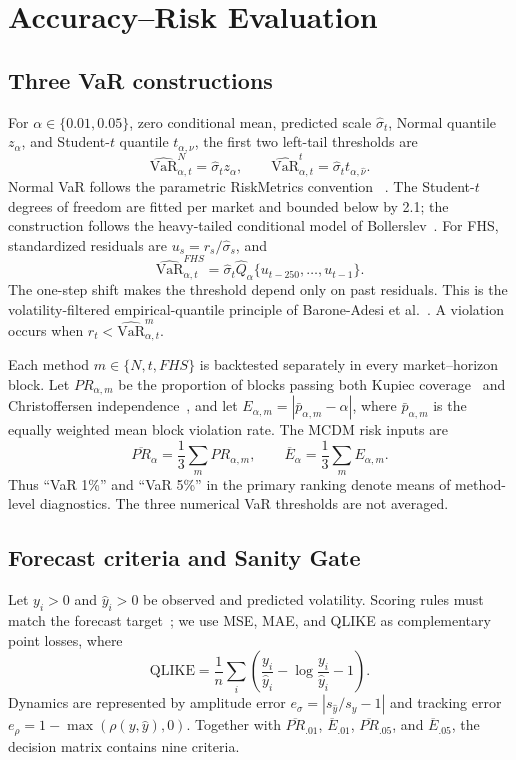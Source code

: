 \documentclass[runningheads]{llncs}
\begin{document}
\section{Accuracy--Risk Evaluation}

\subsection{Three VaR constructions}

For \(\alpha\in\{0.01,0.05\}\), zero conditional mean, predicted scale
\(\hat\sigma_t\), Normal quantile \(z_\alpha\), and Student-\(t\)
quantile \(t_{\alpha,\nu}\), the first two left-tail thresholds are
\[
\widehat{\mathrm{VaR}}^{N}_{\alpha,t}
=\hat\sigma_tz_\alpha,\qquad
\widehat{\mathrm{VaR}}^{t}_{\alpha,t}
=\hat\sigma_tt_{\alpha,\hat\nu}.
\]
Normal VaR follows the parametric RiskMetrics convention
~\cite{riskmetrics1996}. The Student-\(t\) degrees of freedom are fitted
per market and bounded below by 2.1; the construction follows the
heavy-tailed conditional model of Bollerslev~\cite{bollerslev1987}.
For FHS, standardized residuals are
\(u_s=r_s/\hat\sigma_s\), and
\[
\widehat{\mathrm{VaR}}^{FHS}_{\alpha,t}
=\hat\sigma_t\widehat Q_\alpha
\{u_{t-250},\ldots,u_{t-1}\}.
\]
The one-step shift makes the threshold depend only on past residuals.
This is the volatility-filtered empirical-quantile principle of
Barone-Adesi et al.~\cite{baroneadesi1999}. A violation occurs when
\(r_t<\widehat{\mathrm{VaR}}_{\alpha,t}^{m}\).

Each method \(m\in\{N,t,FHS\}\) is backtested separately in every
market--horizon block. Let \(PR_{\alpha,m}\) be the proportion of blocks
passing both Kupiec coverage~\cite{kupiec1995} and Christoffersen
independence~\cite{christoffersen1998}, and let
\(E_{\alpha,m}=|\bar p_{\alpha,m}-\alpha|\), where
\(\bar p_{\alpha,m}\) is the equally weighted mean block violation
rate. The MCDM risk inputs are
\[
\overline{PR}_{\alpha}=\frac{1}{3}\sum_m PR_{\alpha,m},
\qquad
\overline E_{\alpha}=\frac{1}{3}\sum_m E_{\alpha,m}.
\]
Thus ``VaR 1\%'' and ``VaR 5\%'' in the primary ranking denote means of
method-level diagnostics. The three numerical VaR thresholds are not
averaged.

\subsection{Forecast criteria and Sanity Gate}

Let \(y_i>0\) and \(\hat y_i>0\) be observed and predicted volatility.
Scoring rules must match the forecast target~\cite{gneiting2011}; we use
MSE, MAE, and QLIKE as complementary point losses, where
\[
\mathrm{QLIKE}=\frac1n\sum_i\left(
\frac{y_i}{\hat y_i}-\log\frac{y_i}{\hat y_i}-1\right).
\]
Dynamics are represented by amplitude error
\(e_\sigma=|s_{\hat y}/s_y-1|\) and tracking error
\(e_\rho=1-\max(\rho(y,\hat y),0)\). Together with
\(\overline{PR}_{.01}\), \(\overline E_{.01}\),
\(\overline{PR}_{.05}\), and \(\overline E_{.05}\), the decision matrix
contains nine criteria.
\end{document}
